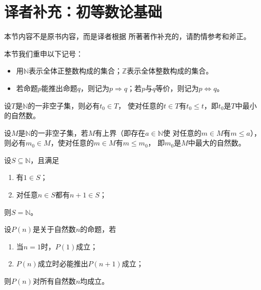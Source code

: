 \section{译者补充：初等数论基础}\label{sec:译者补充：初等数论基础}

\begin{remark}
    本节内容不是原书内容，而是译者根据\citet{ElementaryNumberTheory}
    所著著作补充的，请酌情参考和斧正。
\end{remark}

\begin{notation}
    本节我们重申以下记号：
    \begin{itemize}
        \item 用$\mathbb{N}$表示全体正整数构成的集合；$\mathbb{Z}$表示全体整数构成的集合。
        \item 若命题$p$能推出命题$q$，则记为$p\Rightarrow q$；若$p$与$q$等价，则记为$p\Leftrightarrow q$。
    \end{itemize}
\end{notation}

\begin{theorem}
    设$T$是$\mathbb{N}$的一非空子集，则必有$t_0\in T$，
    使对任意的$t\in T$有$t_0\le t$，即$t_0$是$T$中最小的自然数。
\end{theorem}

\begin{theorem}[最大自然数原理]
    设$M$是$\mathbb{N}$的一非空子集，若$M$有上界（即存在$a\in \mathbb{N}$使
    对任意的$m\in M$有$m\le a$），则必有$m_0\in M$，使对任意的$m\in M$有$m\le m_0$，
    即$m_0$是$M$中最大的自然数。
\end{theorem}

\begin{theorem}
    设$S\subseteq \mathbb{N}$，且满足
    \begin{enumerate}
        \item 有$1\in S$；
        \item 对任意$n\in S$都有$n+1\in S$；
    \end{enumerate}
    则$S=\mathbb{N}$。
\end{theorem}

\begin{theorem}
    设$P(n)$是关于自然数$n$的命题，若
    \begin{enumerate}
        \item 当$n=1$时，$P(1)$成立；
        \item $P(n)$成立时必能推出$P(n+1)$成立；
    \end{enumerate}
    则$P(n)$对所有自然数$n$均成立。
\end{theorem}

